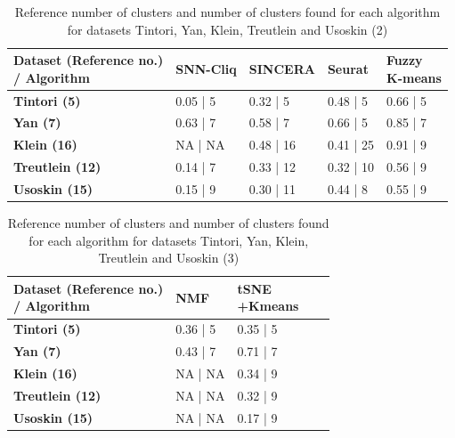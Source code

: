 \documentclass{report}
\begin{document}
{\begin{table}[H]
\centering
\caption{Reference number of clusters and number of clusters found for each algorithm for datasets Tintori, Yan, Klein, Treutlein and Usoskin (2)}
\begin{tabular}{| l | l | l | l | l |}
\hline
\parbox[c]{5cm}{\textbf{Dataset (Reference no.)\\ / Algorithm}} & 
\parbox[c]{2cm}{\textbf{SNN-Cliq}}&
\parbox[c]{2cm}{\textbf{SINCERA}}&
\parbox[c]{2cm}{\textbf{Seurat}}&
\parbox[c]{2cm}{\textbf{Fuzzy\\K-means}}\\
\hline
\parbox[c]{5cm}{\textbf{Tintori (5)}} & 
\parbox[c]{2cm}{0.05 | 5}&
\parbox[c]{2cm}{0.32 | 5}&
\parbox[c]{2cm}{0.48 | 5}&
\parbox[c]{2cm}{0.66 | 5}\\
\hline
\parbox[c]{5cm}{\textbf{Yan (7)}} & 
\parbox[c]{2cm}{0.63 | 7}&
\parbox[c]{2cm}{0.58 | 7}&
\parbox[c]{2cm}{0.66 | 5}&
\parbox[c]{2cm}{0.85 | 7}\\
\hline
\parbox[c]{5cm}{\textbf{Klein (16)}} & 
\parbox[c]{2cm}{NA | NA}&
\parbox[c]{2cm}{0.48 | 16}&
\parbox[c]{2cm}{0.41 | 25}&
\parbox[c]{2cm}{0.91 | 9}\\
\hline
\parbox[c]{5cm}{\textbf{Treutlein (12)}} & 
\parbox[c]{2cm}{0.14 | 7}&
\parbox[c]{2cm}{0.33 | 12}&
\parbox[c]{2cm}{0.32 | 10}&
\parbox[c]{2cm}{0.56 | 9}\\
\hline
\parbox[c]{5cm}{\textbf{Usoskin (15)}} & 
\parbox[c]{2cm}{0.15 | 9}&
\parbox[c]{2cm}{0.30 | 11}&
\parbox[c]{2cm}{0.44 | 8}&
\parbox[c]{2cm}{0.55 | 9}\\
\hline
\end{tabular}
\label{numberclusters22}
\end{table}

\begin{table}[H]
\centering
\caption{Reference number of clusters and number of clusters found for each algorithm for datasets Tintori, Yan, Klein, Treutlein and Usoskin (3)}
\begin{tabular}{| l | l | l | l | l |}
\hline
\parbox[c]{5cm}{\textbf{Dataset (Reference no.)\\ / Algorithm}} & 
\parbox[c]{2cm}{\textbf{NMF}}&
\parbox[c]{2cm}{\textbf{tSNE\\+Kmeans}}\\
\hline
\parbox[c]{5cm}{\textbf{Tintori (5)}} & 
\parbox[c]{2cm}{0.36 | 5}&
\parbox[c]{2cm}{0.35 | 5}\\
\hline
\parbox[c]{5cm}{\textbf{Yan (7)}} & 
\parbox[c]{2cm}{0.43 | 7}&
\parbox[c]{2cm}{0.71 | 7}\\
\hline
\parbox[c]{5cm}{\textbf{Klein (16)}} & 
\parbox[c]{2cm}{NA | NA}&
\parbox[c]{2cm}{0.34 | 9}\\
\hline
\parbox[c]{5cm}{\textbf{Treutlein (12)}} & 
\parbox[c]{2cm}{NA | NA}&
\parbox[c]{2cm}{0.32 | 9}\\
\hline
\parbox[c]{5cm}{\textbf{Usoskin (15)}} & 
\parbox[c]{2cm}{NA | NA}&
\parbox[c]{2cm}{0.17 | 9}\\
\hline
\end{tabular}
\label{numberclusters23}
\end{table}

}
\end{document}
